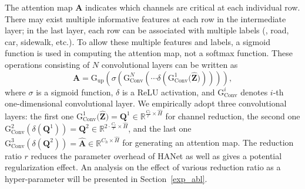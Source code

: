\documentclass[10pt,twocolumn,letterpaper]{article}
\begin{document}
The attention map $\mathbf{A}$ indicates which channels are critical at each individual row. There may exist multiple informative features at each row in the intermediate layer; in the last layer, each row can be associated with multiple labels (\eg, road, car, sidewalk, etc.). To allow these multiple features and labels, a sigmoid function is used in computing the attention map, not a softmax function. These operations consisting of $N$ convolutional layers can be written as \begin{equation}
\mathbf{A}=\text{G}_{\text{up}}\left(\sigma\left(\text{G}_{\text{Conv}}^N\left(\dotsm\delta\left(\text{G}_{\text{Conv}}^1\big(\mathbf{\hat{Z}}\big)\right)\right)\right)\right),
\end{equation}
where $\sigma$ is a sigmoid function, $\delta$ is a ReLU activation, and $\text{G}_{\text{Conv}}^i$ denotes $i$-th one-dimensional convolutional layer. We empirically adopt three convolutional layers:
the first one $\text{G}_{\text{Conv}}^{1}\big(\mathbf{\hat{Z}}\big)=\mathbf{Q}^1\in\mathbb{R}^{\frac{C_\ell}{r}\times \hat{H}}$ for channel reduction, 
the second one $\text{G}_{\text{Conv}}^{2}\left(\delta(\mathbf{Q}^1)\right)=\mathbf{Q}^2\in\mathbb{R}^{2\cdot\frac{C_\ell}{r}\times \hat{H}}$,
and the last one $\text{G}_{\text{Conv}}^{3}\left(\delta(\mathbf{Q}^2)\right)=\mathbf{\hat{A}}\in\mathbb{R}^{C_h\times \hat{H}}$ for generating an attention map.
The reduction ratio $r$ reduces the parameter overhead of HANet as well as gives a potential regularization effect. An analysis on the effect of various reduction ratio as a hyper-parameter will be presented in Section~\ref{exp_abl}. 

\vspace*{-0.1cm}
\end{document}

